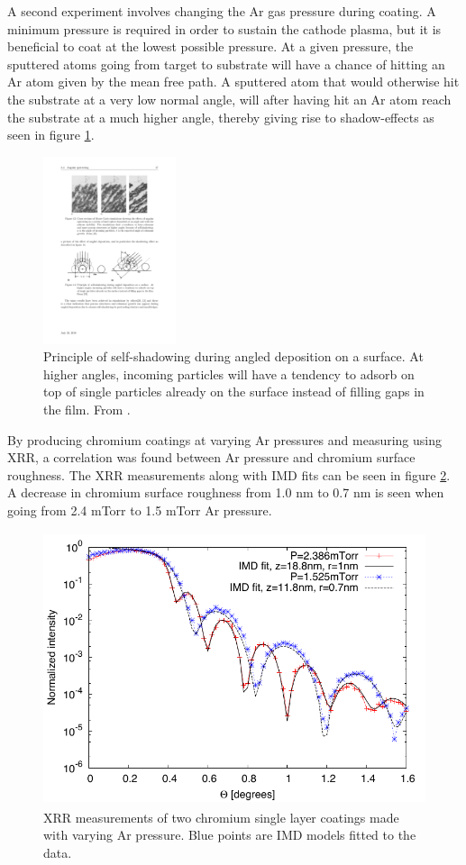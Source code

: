 A second experiment involves changing the Ar gas pressure during coating. A minimum pressure is required in order to sustain the cathode plasma, but it is beneficial to coat at the lowest possible pressure. At a given pressure, the sputtered atoms going from target to substrate will have a chance of hitting an Ar atom given by the mean free path. A sputtered atom that would otherwise hit the substrate at a very low normal angle, will after having hit an Ar atom reach the substrate at a much higher angle, thereby giving rise to shadow-effects\cite{Barabasi:XbjHWFWZ} as seen in figure \ref{fig:self-shadow}.

\begin{figure}[!h]
	\center
	\includegraphics[height=5.5cm]{figures/athena/coatings/self-shadow.pdf}
\caption{\footnotesize Principle of self-shadowing during angled deposition on a surface. At higher angles, incoming particles will have a tendency to adsorb on top of single particles already on the surface instead of filling gaps in the film. From \cite{Dirks:1977uk}.}\label{fig:self-shadow}
\end{figure}

By producing chromium coatings at varying Ar pressures and measuring using XRR, a correlation was found between Ar pressure and chromium surface roughness. The XRR measurements along with IMD fits can be seen in figure \ref{fig:cr-pressure-fit}. A decrease in chromium surface roughness from 1.0 nm to 0.7 nm is seen when going from 2.4 mTorr to 1.5 mTorr Ar pressure.

\begin{figure}[!h]
	\center
	\includegraphics[height=8cm]{figures/athena/coatings/cr-pressure-fit.pdf}
\caption{\footnotesize XRR measurements of two chromium single layer coatings made with varying Ar pressure. Blue points are IMD models fitted to the data.}\label{fig:cr-pressure-fit}
\end{figure}

